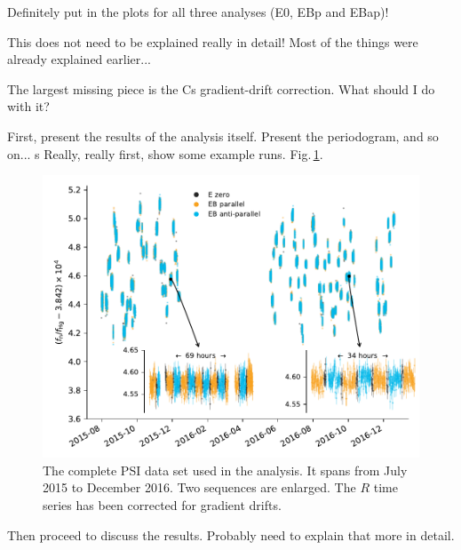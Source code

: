 Definitely put in the plots for all three analyses (E0, EBp and EBap)!

This does not need to be explained really in detail! Most of the things were already explained earlier...

The largest missing piece is the Cs gradient-drift correction. What should I do with it?

First, present the results of the analysis itself. Present the periodogram, and so on...
s
Really, really first, show some example runs. Fig.\,\ref{fig:PSI_dataset_time_domain}.

\begin{figure}
  \centering
  \includegraphics[width=\linewidth]{gfx/axions/deltah4mm_time_domain_inset_no_yerr.pdf}
  \caption{The complete PSI data set used in the analysis. It spans from July 2015 to December 2016. Two sequences are enlarged. The $R$ time series has been corrected for gradient drifts.}
  \label{fig:PSI_dataset_time_domain}
\end{figure}

Then proceed to discuss the results. Probably need to explain that more in detail.

